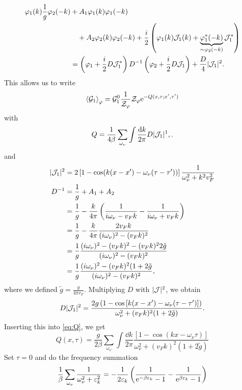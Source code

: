 \begin{align*}
\varphi_1(k)\frac{1}{g}\varphi_2(-k) &+ A_1\varphi_1(k)\varphi_1(-k) \\
&\quad + A_2\varphi_2(k)\varphi_2(-k) + \frac i2\left(\varphi_1(k)\mathcal{J}_1(k) + \underbrace{\varphi_1^*(-k)}_{\sim\varphi_2(-k)}\mathcal{J}_1^*\right) \\
&= \left(\varphi_1+\frac{i}{2}D\mathcal{J}_1^*\right)D^{-1}\left(\varphi_2+\frac{i}{2}D\mathcal{J}_1\right) + \frac{D}{4}|\mathcal{J}_1|^2. 
\end{align*}
This allows us to write
\begin{equation}
\label{eq:gre_almost_final}
\ev{\gre_1}_\p = \gre_1^0\frac{1}{\Z_\p}\Z_\p\e^{-Q(x, \tau;x',\tau')}
\end{equation}
with
\begin{equation}
\label{eq:Q}
Q = \frac{1}{4\beta}\sum_{\omega_\nu}\int\frac{\dd{k}}{2\pi}D|\mathcal{J}_1|^1, .
\end{equation}
and
\begin{align*}
|\mathcal{J}_1|^2 &= 2\left[1-\cos(k(x-x')-\omega_\nu(\tau-\tau'))\right]\frac{1}{\omega_\nu^2 + k^2v_F^2}\\
D^{-1} &= \frac{1}{g} + A_1+A_2 \\
&= \frac1g-\frac{k}{4\pi}\left(\frac{1}{i\omega_\nu - v_Fk}-\frac{1}{i\omega_\nu+v_Fk}\right) \\
&=\frac{1}{g}-\frac{k}{4\pi}\frac{2v_Fk}{(i\omega_\nu)^2-(v_Fk)^2} \\
&=\frac{1}{g}\frac{(i\omega_\nu)^2-(v_Fk)^2-(v_Fk)^22\tilde{g}}{(i\omega_\nu)^2-(v_Fk)^2} \\
&= \frac1g \frac{(i\omega_\nu)^2-(v_Fk)^2(1+2\tilde{g}}{(i\omega_\nu)^2-(v_Fk)^2},
\end{align*}
where we defined \(\tilde{g} = \frac{g}{4\pi v_F}\). Multiplying \(D\) with \(|\mathcal{J}|^2\), we obtain
\begin{equation}
D|\mathcal{J}_1|^2 = \frac{2g\left(1-\cos\left[k(x-x')-\omega_\nu(\tau-\tau')\right]\right)}{\omega_\nu^2+(v_Fk)^2(1+2\tilde{g})}.
\end{equation}
Inserting this into \cref{eq:Q}, we get
\begin{equation}
Q(x, \tau) = \frac{g}{2\beta}\sum_{\omega_\nu}\int\frac{\dd{k}}{2\pi}\frac{\left[1-\cos\left(kx-\omega_\nu\tau\right)\right]}{\omega_\nu^2+(v_Fk)^2(1+2\tilde{g})}
\end{equation}
Set \(\tau = 0\) and do the frequency summation
\begin{equation*}
	\frac1\beta\sum_{\omega_\nu}\frac{1}{\omega_\nu^2 +\varepsilon_k^2} = -\frac{1}{2\varepsilon_k}\left(\frac{1}{\mathrm{e}^{-\beta\varepsilon_k}-1} - \frac{1}{\mathrm{e}^{\beta\varepsilon_k}-1}\right)
\end{equation*}
